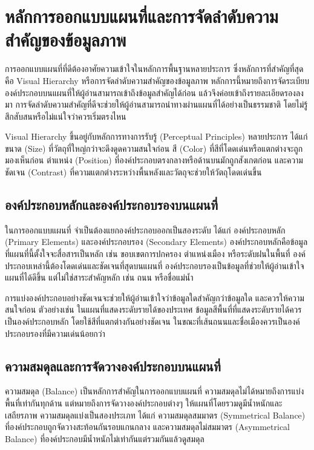 \section{หลักการออกแบบแผนที่และการจัดลำดับความสำคัญของข้อมูลภาพ}

การออกแบบแผนที่ที่ดีต้องอาศัยความเข้าใจในหลักการพื้นฐานหลายประการ ซึ่งหลักการที่สำคัญที่สุดคือ Visual Hierarchy หรือการจัดลำดับความสำคัญของข้อมูลภาพ หลักการนี้หมายถึงการจัดระเบียบองค์ประกอบบนแผนที่ให้ผู้อ่านสามารถเข้าถึงข้อมูลสำคัญได้ก่อน แล้วจึงค่อยเข้าถึงรายละเอียดรองลงมา การจัดลำดับความสำคัญที่ดีจะช่วยให้ผู้อ่านสามารถนำทางผ่านแผนที่ได้อย่างเป็นธรรมชาติ โดยไม่รู้สึกสับสนหรือไม่แน่ใจว่าควรเริ่มตรงไหน

Visual Hierarchy ขึ้นอยู่กับหลักการทางการรับรู้ (Perceptual Principles) หลายประการ ได้แก่ ขนาด (Size) ที่วัตถุที่ใหญ่กว่าจะดึงดูดความสนใจก่อน สี (Color) ที่สีที่โดดเด่นหรือแตกต่างจะถูกมองเห็นก่อน ตำแหน่ง (Position) ที่องค์ประกอบตรงกลางหรือด้านบนมักถูกสังเกตก่อน และความชัดเจน (Contrast) ที่ความแตกต่างระหว่างพื้นหลังและวัตถุจะช่วยให้วัตถุโดดเด่นขึ้น

\subsection{องค์ประกอบหลักและองค์ประกอบรองบนแผนที่}

ในการออกแบบแผนที่ จำเป็นต้องแยกองค์ประกอบออกเป็นสองระดับ ได้แก่ องค์ประกอบหลัก (Primary Elements) และองค์ประกอบรอง (Secondary Elements) องค์ประกอบหลักคือข้อมูลที่แผนที่นี้ตั้งใจจะสื่อสารเป็นหลัก เช่น ขอบเขตการปกครอง ตำแหน่งเมือง หรือระดับฝนในพื้นที่ องค์ประกอบเหล่านี้ต้องโดดเด่นและชัดเจนที่สุดบนแผนที่ องค์ประกอบรองเป็นข้อมูลที่ช่วยให้ผู้อ่านเข้าใจแผนที่ได้ดีขึ้น แต่ไม่ใช่สาระสำคัญหลัก เช่น ถนน หรือชื่อแม่น้ำ

การแบ่งองค์ประกอบอย่างชัดเจนจะช่วยให้ผู้อ่านเข้าใจว่าข้อมูลใดสำคัญกว่าข้อมูลใด และควรให้ความสนใจก่อน ตัวอย่างเช่น ในแผนที่แสดงระดับรายได้ของประเทศ ข้อมูลสีพื้นที่ที่แสดงระดับรายได้ควรเป็นองค์ประกอบหลัก โดยใช้สีที่แตกต่างกันอย่างชัดเจน ในขณะที่เส้นถนนและชื่อเมืองควรเป็นองค์ประกอบรองที่มีความเด่นน้อยกว่า

\subsection{ความสมดุลและการจัดวางองค์ประกอบบนแผนที่}

ความสมดุล (Balance) เป็นหลักการสำคัญในการออกแบบแผนที่ ความสมดุลไม่ได้หมายถึงการแบ่งพื้นที่เท่ากันทุกด้าน แต่หมายถึงการจัดวางองค์ประกอบต่างๆ ให้แผนที่โดยรวมดูมีน้ำหนักและเสถียรภาพ ความสมดุลแบ่งเป็นสองประเภท ได้แก่ ความสมดุลสมมาตร (Symmetrical Balance) ที่องค์ประกอบถูกจัดวางสะท้อนกันรอบแกนกลาง และความสมดุลไม่สมมาตร (Asymmetrical Balance) ที่องค์ประกอบมีน้ำหนักไม่เท่ากันแต่รวมกันแล้วดูสมดุล

